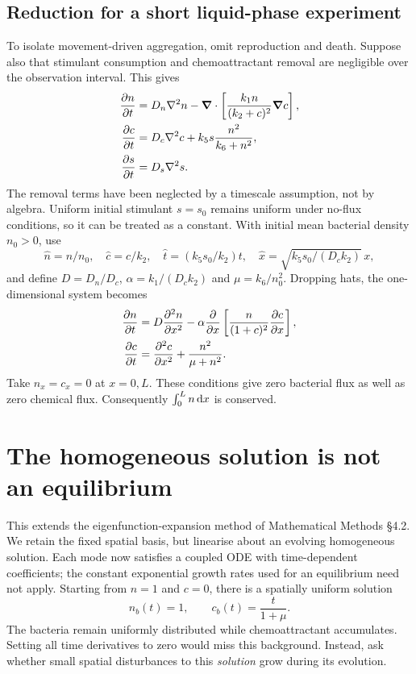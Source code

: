 \documentclass[main.tex]{subfiles}
\begin{document}
\subsection{Reduction for a short liquid-phase experiment}
To isolate movement-driven aggregation, omit reproduction and death. Suppose also that stimulant consumption and chemoattractant removal are negligible over the observation interval. This gives
\begin{align}\label{liquidphasefull}
\pd{n}{t}&=D_n\nabla^2n-\vnabla\cdot\left[\frac{k_1n}{(k_2+c)^2}\vnabla c\right],\\
\pd{c}{t}&=D_c\nabla^2c+k_5s\frac{n^2}{k_6+n^2},\\
\pd{s}{t}&=D_s\nabla^2s.
\end{align}
The removal terms have been neglected by a timescale assumption, not by algebra. Uniform initial stimulant $s=s_0$ remains uniform under no-flux conditions, so it can be treated as a constant. With initial mean bacterial density $n_0>0$, use
\begin{equation}
\widehat n=n/n_0,\quad \widehat c=c/k_2,\quad
\widehat t=(k_5s_0/k_2)t,\quad
\widehat x=\sqrt{k_5s_0/(D_ck_2)}\,x,
\end{equation}
and define $D=D_n/D_c$, $\alpha=k_1/(D_ck_2)$ and $\mu=k_6/n_0^2$.
Dropping hats, the one-dimensional system becomes
\begin{align}\label{liquidphase}
\pd{n}{t}&=D\pdd{n}{x}-\alpha\pd{}{x}\left[\frac{n}{(1+c)^2}\pd{c}{x}\right],\\
\pd{c}{t}&=\pdd{c}{x}+\frac{n^2}{\mu+n^2}.
\end{align}
Take $n_x=c_x=0$ at $x=0,L$. These conditions give zero bacterial flux as well as zero chemical flux. Consequently $\int_0^L n\,\mathrm{d} x$ is conserved.

\section{The homogeneous solution is not an equilibrium}
This extends the eigenfunction-expansion method of Mathematical Methods \S4.2. We retain the fixed spatial basis, but linearise about an evolving homogeneous solution. Each mode now satisfies a coupled ODE with time-dependent coefficients; the constant exponential growth rates used for an equilibrium need not apply.
Starting from $n=1$ and $c=0$, there is a spatially uniform solution
\begin{equation}\label{merged:background}
n_b(t)=1,\qquad c_b(t)=\frac{t}{1+\mu}.
\end{equation}
The bacteria remain uniformly distributed while chemoattractant accumulates. Setting all time derivatives to zero would miss this background. Instead, ask whether small spatial disturbances to this \emph{solution} grow during its evolution.
\end{document}
